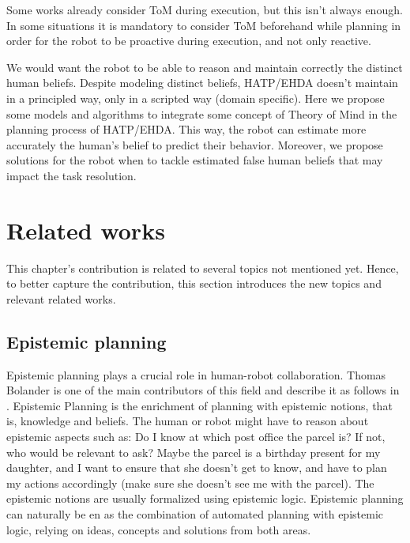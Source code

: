 Some works already consider ToM during execution, but this isn't always enough. In some situations it is mandatory to consider ToM beforehand while planning in order for the robot to be proactive during execution, and not only reactive. 

We would want the robot to be able to reason and maintain correctly the distinct human beliefs. Despite modeling distinct beliefs, HATP/EHDA doesn't maintain in a principled way, only in a scripted way (domain specific). Here we propose some models and algorithms to integrate some concept of Theory of Mind in the planning process of HATP/EHDA. This way, the robot can estimate more accurately the human's belief to predict their behavior. Moreover, we propose solutions for the robot when to tackle estimated false human beliefs that may impact the task resolution.




\section{Related works}

    This chapter's contribution is related to several topics not mentioned yet. Hence, to better capture the contribution, this section introduces the new topics and relevant related works.  

    \subsection{Epistemic planning}
    Epistemic planning plays a crucial role in human-robot collaboration. Thomas Bolander is one of the main contributors of this field and describe it as follows in \cite{bolander_gentle_2017}. Epistemic Planning is the enrichment of planning with epistemic notions, that is, knowledge and beliefs. The human or robot might have to reason about epistemic aspects such as: Do I know at which post office the parcel is? If not, who would be relevant to ask? Maybe the parcel is a birthday present for my daughter, and I want to ensure that she doesn't get to know, and have to plan my actions accordingly (make sure she doesn't see me with the parcel). The epistemic notions are usually formalized using epistemic logic. Epistemic planning can naturally be en as the combination of automated planning with epistemic logic, relying on ideas, concepts and solutions from both areas. 

